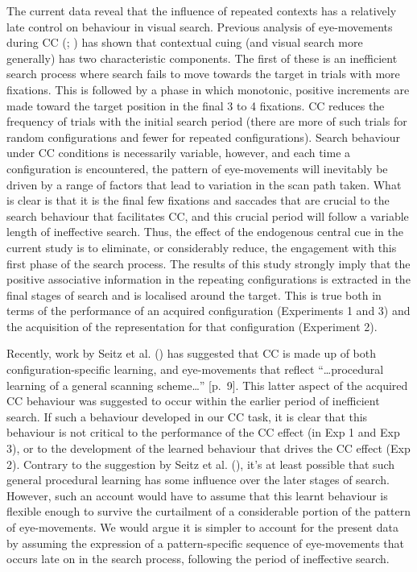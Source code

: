 \documentclass[
  man,
  floatsintext,
  longtable,
  nolmodern,
  notxfonts,
  notimes,
  colorlinks=true,linkcolor=blue,citecolor=blue,urlcolor=blue]{apa7}
\begin{document}
The current data reveal that the influence of repeated contexts has a
relatively late control on behaviour in visual search. Previous analysis
of eye-movements during CC (; ) has shown that
contextual cuing (and visual search more generally) has two
characteristic components. The first of these is an inefficient search
process where search fails to move towards the target in trials with
more fixations. This is followed by a phase in which monotonic, positive
increments are made toward the target position in the final 3 to 4
fixations. CC reduces the frequency of trials with the initial search
period (there are more of such trials for random configurations and
fewer for repeated configurations). Search behaviour under CC conditions
is necessarily variable, however, and each time a configuration is
encountered, the pattern of eye-movements will inevitably be driven by a
range of factors that lead to variation in the scan path taken. What is
clear is that it is the final few fixations and saccades that are
crucial to the search behaviour that facilitates CC, and this crucial
period will follow a variable length of ineffective search. Thus, the
effect of the endogenous central cue in the current study is to
eliminate, or considerably reduce, the engagement with this first phase
of the search process. The results of this study strongly imply that the
positive associative information in the repeating configurations is
extracted in the final stages of search and is localised around the
target. This is true both in terms of the performance of an acquired
configuration (Experiments 1 and 3) and the acquisition of the
representation for that configuration (Experiment 2).

Recently, work by Seitz et al. () has
suggested that CC is made up of both configuration-specific learning,
and eye-movements that reflect ``\ldots procedural learning of a general
scanning scheme\ldots{}'' {[}p.~9{]}. This latter aspect of the acquired
CC behaviour was suggested to occur within the earlier period of
inefficient search. If such a behaviour developed in our CC task, it is
clear that this behaviour is not critical to the performance of the CC
effect (in Exp 1 and Exp 3), or to the development of the learned
behaviour that drives the CC effect (Exp 2). Contrary to the suggestion
by Seitz et al. (), it's at least possible
that such general procedural learning has some influence over the later
stages of search. However, such an account would have to assume that
this learnt behaviour is flexible enough to survive the curtailment of a
considerable portion of the pattern of eye-movements. We would argue it
is simpler to account for the present data by assuming the expression of
a pattern-specific sequence of eye-movements that occurs late on in the
search process, following the period of ineffective search.
\end{document}

